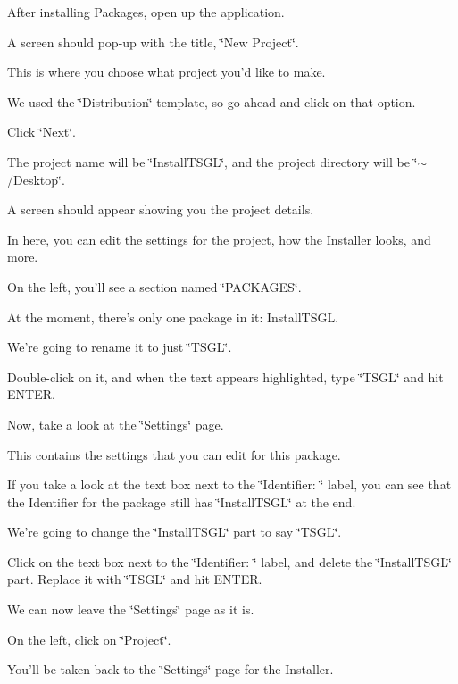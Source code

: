 After installing Packages, open up the application.

A screen should pop-\/up with the title, \char`\"{}\-New Project\char`\"{}.

This is where you choose what project you'd like to make.

We used the \char`\"{}\-Distribution\char`\"{} template, so go ahead and click on that option.

Click \char`\"{}\-Next\char`\"{}.

The project name will be \char`\"{}\-Install\-T\-S\-G\-L\char`\"{}, and the project directory will be \char`\"{}$\sim$/\-Desktop\char`\"{}.

A screen should appear showing you the project details.

In here, you can edit the settings for the project, how the Installer looks, and more.

On the left, you'll see a section named \char`\"{}\-P\-A\-C\-K\-A\-G\-E\-S\char`\"{}.

At the moment, there's only one package in it\-: Install\-T\-S\-G\-L.

We're going to rename it to just \char`\"{}\-T\-S\-G\-L\char`\"{}.

Double-\/click on it, and when the text appears highlighted, type \char`\"{}\-T\-S\-G\-L\char`\"{} and hit E\-N\-T\-E\-R.

Now, take a look at the \char`\"{}\-Settings\char`\"{} page.

This contains the settings that you can edit for this package.

If you take a look at the text box next to the \char`\"{}\-Identifier\-: \char`\"{} label, you can see that the Identifier for the package still has \char`\"{}\-Install\-T\-S\-G\-L\char`\"{} at the end.

We're going to change the \char`\"{}\-Install\-T\-S\-G\-L\char`\"{} part to say \char`\"{}\-T\-S\-G\-L\char`\"{}.

Click on the text box next to the \char`\"{}\-Identifier\-: \char`\"{} label, and delete the \char`\"{}\-Install\-T\-S\-G\-L\char`\"{} part. Replace it with \char`\"{}\-T\-S\-G\-L\char`\"{} and hit E\-N\-T\-E\-R.

We can now leave the \char`\"{}\-Settings\char`\"{} page as it is.

On the left, click on \char`\"{}\-Project\char`\"{}.

You'll be taken back to the \char`\"{}\-Settings\char`\"{} page for the Installer.

